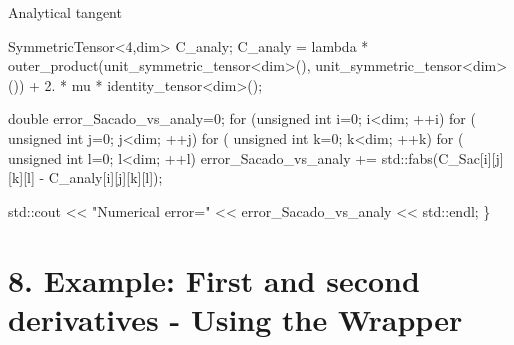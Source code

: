  Analytical tangent 
\begin{DoxyCode}
     SymmetricTensor<4,dim> C\_analy;
     C\_analy = lambda * outer\_product(unit\_symmetric\_tensor<dim>(), unit\_symmetric\_tensor<dim>()) + 2. * mu
       * identity\_tensor<dim>();
 
    \textcolor{keywordtype}{double} error\_Sacado\_vs\_analy=0;
    \textcolor{keywordflow}{for} (\textcolor{keywordtype}{unsigned} \textcolor{keywordtype}{int} i=0; i<dim; ++i)
        \textcolor{keywordflow}{for} ( \textcolor{keywordtype}{unsigned} \textcolor{keywordtype}{int} j=0; j<dim; ++j)
            \textcolor{keywordflow}{for} ( \textcolor{keywordtype}{unsigned} \textcolor{keywordtype}{int} k=0; k<dim; ++k)
                \textcolor{keywordflow}{for} ( \textcolor{keywordtype}{unsigned} \textcolor{keywordtype}{int} l=0; l<dim; ++l)
                    error\_Sacado\_vs\_analy += std::fabs(C\_Sac[i][j][k][l] - C\_analy[i][j][k][l]);
 
    std::cout << \textcolor{stringliteral}{"Numerical error="} << error\_Sacado\_vs\_analy << std::endl;
\}
\end{DoxyCode}
 \hypertarget{index_Ex8}{}\section{8. Example\+: First and second derivatives -\/ Using the Wrapper}\label{index_Ex8}

